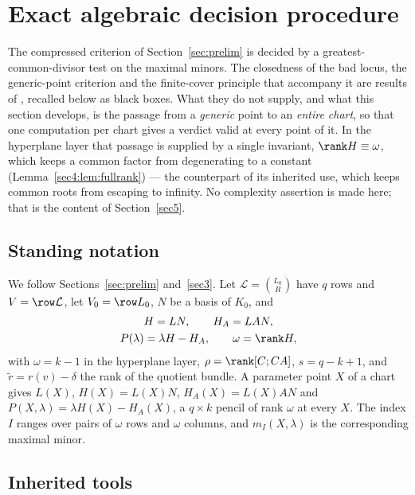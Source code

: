 \section{Exact algebraic decision procedure}
\label{sec4}\label{sec:decision}

The compressed criterion of Section~\ref{sec:prelim} is decided by a greatest-common-divisor test on
the maximal minors. The closedness of the bad locus, the generic-point criterion and the finite-cover
principle that accompany it are results of \cite{companion1}, recalled below as black boxes. What they
do not supply, and what this section develops, is the passage from a \emph{generic} point to an
\emph{entire chart}, so that one computation per chart gives a verdict valid at every point of it. In
the hyperplane layer that passage is supplied by a single invariant, $\rank H\equiv\omega$, which keeps
a common factor from degenerating to a constant (Lemma~\ref{sec4:lem:fullrank}) --- the counterpart of
its inherited use, which keeps common roots from escaping to infinity. No complexity assertion is made
here; that is the content of Section~\ref{sec5}.

\subsection{Standing notation}
\label{sec4:notation}

We follow Sections~\ref{sec:prelim} and~\ref{sec3}. Let $\mathcal L=\binom{L_0}{R}$ have $q$ rows and
$V=\row\mathcal L$, let $V_0=\row L_0$, $N$ be a basis of $K_0$, and
\[
\begin{gathered}
H=LN,\qquad H_A=LAN,\\
P(\lambda)=\lambda H-H_A,\qquad \omega=\rank H ,
\end{gathered}
\]
with $\omega=k-1$ in the hyperplane layer, $\rho=\rank[C;CA]$, $s=q-k+1$, and
$\widetilde r=r(v)-\delta$ the rank of the quotient bundle. A parameter point $X$ of a chart gives
$L(X)$, $H(X)=L(X)N$, $H_A(X)=L(X)AN$ and $P(X,\lambda)=\lambda H(X)-H_A(X)$, a $q\times k$ pencil of
rank $\omega$ at every $X$. The index $I$ ranges over pairs of $\omega$ rows and $\omega$ columns, and
$m_I(X,\lambda)$ is the corresponding maximal minor.

\subsection{Inherited tools}
\label{sec4:inherited}

